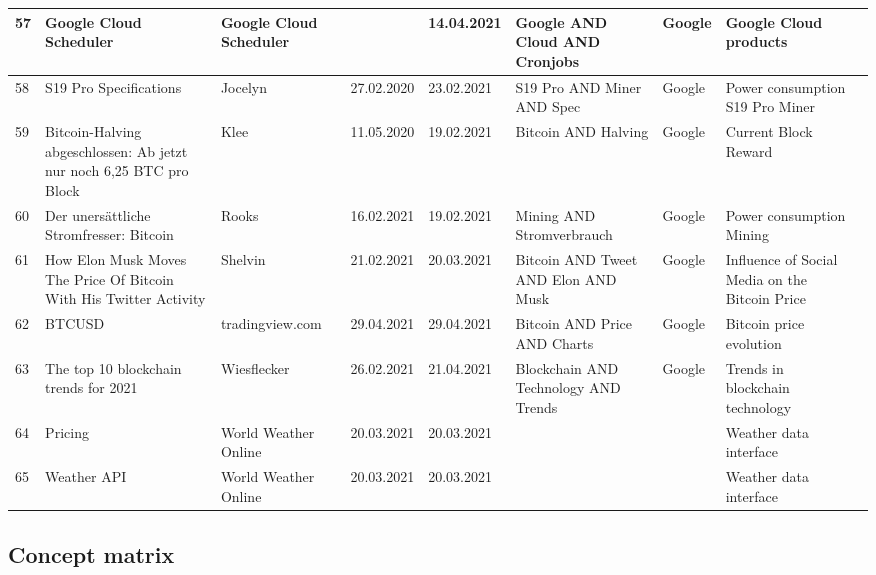 \begin{table}[H]
\begin{tabularx}{\textwidth}[ht]{|l|X|X|l|l|X|l|X|X|}
		\hline
		57 & Google Cloud Scheduler & Google Cloud Scheduler & & 14.04.2021 & Google AND Cloud AND Cronjobs & Google & Google Cloud products \\
		\hline
		58 & S19 Pro Specifications & Jocelyn & 27.02.2020 & 23.02.2021 & S19 Pro AND Miner AND Spec & Google & Power consumption S19 Pro Miner \\
		\hline
		59 & Bitcoin-Halving abgeschlossen: Ab jetzt nur noch 6,25 BTC pro Block & Klee & 11.05.2020 & 19.02.2021 & Bitcoin AND Halving & Google & Current Block Reward \\
		\hline
		60 & Der unersättliche Stromfresser: Bitcoin & Rooks & 16.02.2021 & 19.02.2021 & Mining AND Stromverbrauch & Google & Power consumption Mining \\
		\hline
		61 & How Elon Musk Moves The Price Of Bitcoin With His Twitter Activity & Shelvin & 21.02.2021 & 20.03.2021 & Bitcoin AND Tweet AND Elon AND Musk & Google & Influence of Social Media on the Bitcoin Price \\
		\hline
		62 & BTCUSD & tradingview.com & 29.04.2021 & 29.04.2021 & Bitcoin AND Price AND Charts & Google & Bitcoin price evolution \\
		\hline
		63 & The top 10 blockchain trends for 2021 & Wiesflecker & 26.02.2021 & 21.04.2021 & Blockchain AND Technology AND Trends & Google & Trends in blockchain technology \\
		\hline
		64 & Pricing & World Weather Online & 20.03.2021 & 20.03.2021 & & & Weather data interface \\
		\hline
		65 & Weather API & World Weather Online & 20.03.2021 & 20.03.2021 & & & Weather data interface \\
		\hline
	\end{tabularx}
\end{table}

\subsection{Concept matrix} \label{toc:konzeptmatrix}

